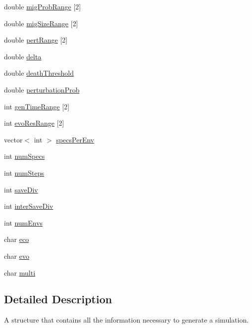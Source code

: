 \begin{DoxyCompactItemize}
\item 
double \hyperlink{structsimParams_a4a67c773b31598604c56efc130a69945}{mig\+Prob\+Range} \mbox{[}2\mbox{]}
\item 
double \hyperlink{structsimParams_a2486796d56e9fbe5d9f2dbd507a6ce5d}{mig\+Size\+Range} \mbox{[}2\mbox{]}
\item 
double \hyperlink{structsimParams_a9b9d328e41381a83004b5fa062248fc7}{pert\+Range} \mbox{[}2\mbox{]}
\item 
double \hyperlink{structsimParams_a1d2d1053c8780cea2eb1f703b1bcafd0}{delta}
\item 
double \hyperlink{structsimParams_aec04ef00f25e3bb5585a7a4b50c32b9a}{death\+Threshold}
\item 
double \hyperlink{structsimParams_aa07ddc0d55d057a586dc98ffd113e064}{perturbation\+Prob}
\item 
int \hyperlink{structsimParams_ace2069f1d65920fe32e4236c12e91ea9}{gen\+Time\+Range} \mbox{[}2\mbox{]}
\item 
int \hyperlink{structsimParams_a4121b97ac4b40f6d309693847309ce6b}{evo\+Res\+Range} \mbox{[}2\mbox{]}
\item 
vector$<$ int $>$ \hyperlink{structsimParams_aede5150c0b33bacae326638341a4e906}{specs\+Per\+Env}
\item 
int \hyperlink{structsimParams_a83b3c9f8e5dee0b7b4e63a17dc2646bd}{num\+Specs}
\item 
int \hyperlink{structsimParams_a027234312109ab21e3f8dacda4039c9f}{num\+Steps}
\item 
int \hyperlink{structsimParams_ad9fb5fcc3890d022270dbe00ec3a7c1e}{save\+Div}
\item 
int \hyperlink{structsimParams_a2114f7c6664772255e0e8afcf9334ebf}{inter\+Save\+Div}
\item 
int \hyperlink{structsimParams_a5d284deecb9cbd1b2680670822cae29a}{num\+Envs}
\item 
char \hyperlink{structsimParams_ac1a96378c33a770e34ffba03498735c9}{eco}
\item 
char \hyperlink{structsimParams_a26cb871bb244145cf0b4d1754864f276}{evo}
\item 
char \hyperlink{structsimParams_a2c0a57da585258a84362a2c297ee44cb}{multi}
\end{DoxyCompactItemize}


\subsection{Detailed Description}
A structure that contains all the information necessary to generate a simulation. 


